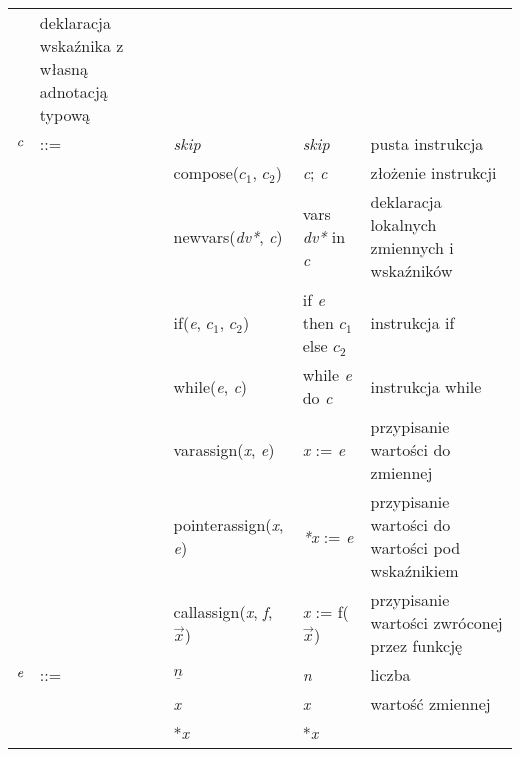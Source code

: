 \documentclass{article}
\begin{document}
\begin{table}[H]
\begin{tabular}{lllp{3.5cm}p{5.6cm}}
           & deklaracja wskaźnika  z własną adnotacją typową\\
        $ \emph{c}$ & ::= & \emph{skip}                                                          & \emph{skip}                                                          & pusta instrukcja \\
                    &     & compose($c_1$, $c_2$)                                 & \emph{c}; \emph{c}                                      & złożenie instrukcji \\
                    &     & newvars(\emph{dv*}, \emph{c})                                      & vars \emph{dv*} in \emph{c}                              
           & deklaracja lokalnych zmiennych i wskaźników \\
                    &     & if(\emph{e}, $c_1$, $c_2$)                                          & if \emph{e} then $c_1$ else $c_2$                                  
           & instrukcja if \\
                    &     & while(\emph{e}, \emph{c})                                                   & while \emph{e} do \emph{c}                                  
           & instrukcja while \\
                    &     & varassign(\emph{x}, \emph{e})                                               & \emph{x} := \emph{e}                                      
           & przypisanie wartości do zmiennej\\
                    &     & pointerassign(\emph{x}, \emph{e})                                           & \emph{*x} := \emph{e}                                     
           & przypisanie wartości do wartości pod wskaźnikiem \\
                    &     & callassign(\emph{x}, \emph{f}, $\Vec{x}$)                                         & \emph{x} := f($\Vec{x}$)                             
           & przypisanie wartości zwróconej przez funkcję \\
        $ \emph{e}$ & ::= & $\underline{n} $                                              & \emph{n}                                                             & liczba \\
                    &     & \emph{x}                                                      & \emph{x}                                                   
           & wartość zmiennej \\
                    &     & *\emph{x}                                                     & *\emph{x}              

\end{tabular}
\end{table}
\end{document}
